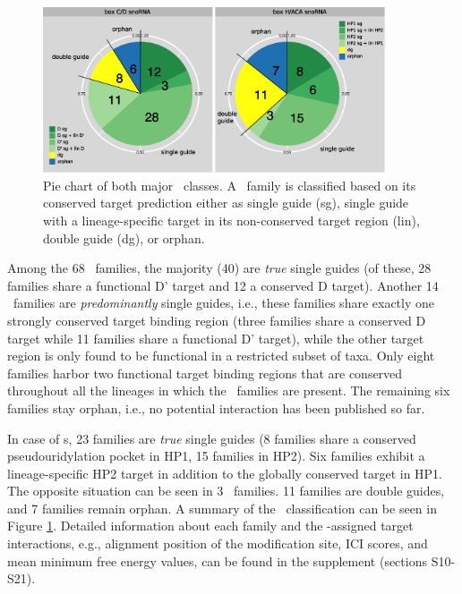 \begin{figure}
  \centering
  \includegraphics[width=0.9\textwidth]{pics/pieCharts_snoRNAs_modified.eps}
  \caption[Classification of \sno\ families as single or double
  guides.]{Pie chart of both major \sno\ classes. A \sno\ family is
    classified based on its conserved target prediction either as
    single guide (sg), single guide with a lineage-specific target in
    its non-conserved target region (lin), double guide (dg), or
    orphan.}
  \label{fig:pie_charts}
\end{figure}

Among the 68 \cd\ families, the majority (40) are \textit{true} single
guides  (of these, 28 families share a functional D' target
and 12 a conserved D target). Another 14 \cd\ families are
\textit{predominantly} single guides, i.e., these families share
exactly one strongly conserved target binding region (three families
share a conserved D target while 11 families share a functional D'
target), while the other target region is only found to be functional
in a restricted subset of taxa. Only eight families harbor two
functional target binding regions that are conserved throughout all
the lineages in which the \sno\ families are present. The remaining
six families stay orphan, i.e., no potential interaction has been
published so far.

In case of {\haca}s, 23 families are \textit{true} single guides (8
families share a conserved pseudouridylation pocket in HP1, 15
families in HP2). Six families exhibit a lineage-specific HP2 target
in addition to the globally conserved target in HP1. The opposite situation
can be seen in 3 \haca\ families. 11 families are double guides, and 7
families remain orphan. A summary of the \sno\ classification can be seen in
Figure \ref{fig:pie_charts}.  Detailed information about each family and
the \snostrip-assigned target interactions, e.g., alignment position of the
modification site, ICI scores, and mean minimum free energy values, can be
found in the supplement (sections S10-S21).


